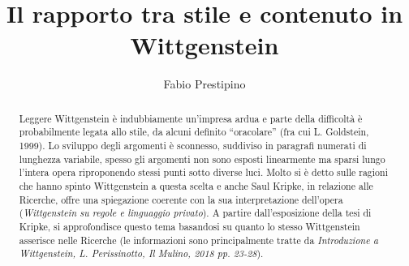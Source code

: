 \documentclass[10pt,a4paper]{article}
\author{Fabio Prestipino}
\title{
	Il rapporto tra stile e contenuto in Wittgenstein}
\begin{document}
	\maketitle
\begin{abstract}
	Leggere Wittgenstein è indubbiamente un’impresa ardua e parte della difficoltà è probabilmente legata allo stile, da alcuni definito “oracolare” (fra cui L. Goldstein, 1999). Lo sviluppo degli argomenti è sconnesso, suddiviso in paragrafi numerati di lunghezza variabile, spesso gli argomenti non sono esposti linearmente ma sparsi lungo l’intera opera riproponendo stessi punti sotto diverse luci. Molto si è detto sulle ragioni che hanno spinto Wittgenstein a questa scelta e anche Saul Kripke, in relazione alle Ricerche, offre una spiegazione coerente con la sua interpretazione dell'opera (\textit{Wittgenstein su regole e linguaggio privato}). A partire dall’esposizione della tesi di Kripke, si approfondisce questo tema basandosi su quanto lo stesso Wittgenstein asserisce nelle Ricerche (le informazioni sono principalmente tratte da \textit{Introduzione a Wittgenstein, L. Perissinotto, Il Mulino, 2018 pp. 23-28}).
\end{abstract}
\end{document}

